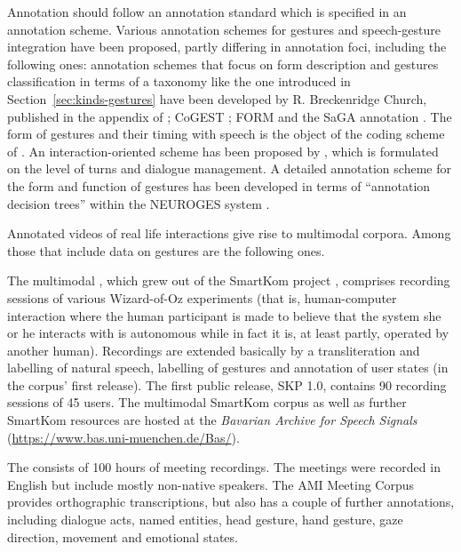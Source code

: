 \documentclass[output=paper
                ,modfonts
                ,nonflat
	        ,collection
	        ,collectionchapter
	        ,collectiontoclongg
 	        ,biblatex
                ,babelshorthands
                ,newtxmath
                ,draftmode
                ,colorlinks, citecolor=brown
]{./langsci/langscibook}
\begin{document}
Annotation should follow an annotation standard which is specified in an annotation scheme.
%
Various annotation schemes for gestures and speech-gesture integration have been proposed, partly differing in annotation foci, including the following ones:
%
annotation schemes that focus on form description and gestures classification in terms of a taxonomy like the one introduced in Section~\ref{sec:kinds-gestures} have been developed by R. Breckenridge Church, published in the appendix of \citet{McNeill:1992}; CoGEST \citep{Gibbon:et:al:2003}; FORM \citep{Martell:Osborn:Friedman:Howard:2002} and the SaGA annotation \citep{Luecking:Bergmann:Hahn:Kopp:Rieser:2013}.
%
The form of gestures and their timing with speech is the object of the coding scheme of \citet{Kipp:Neff:Albrecht:2007}.
%
An interaction-oriented scheme has been proposed by \citet{Allwood:et:al:2007}, which is formulated on the level of turns and dialogue management.
%
A detailed annotation scheme for the form and function of gestures has been developed in terms of \enquote{annotation decision trees} within the NEUROGES system \citep{Lausberg:Sloetjes:2009}.


Annotated videos of real life interactions give rise to multimodal corpora. 
%
Among those that include data on gestures are the following ones.

The multimodal  \citep{Schiel:Steininger:Tuerk:2003}, which grew out of the SmartKom project \citep{Wahlster:2006}, comprises recording sessions of various Wizard-of-Oz experiments (that is, human-computer interaction where the human participant is made to believe that the system she or he interacts with is autonomous while in fact it is, at least partly, operated by another human).
%
Recordings are extended basically by a transliteration and labelling of natural speech, labelling of gestures and annotation of user states (in the corpus' first release). 
%
The first public release, SKP 1.0, contains 90 recording sessions of 45 users. 
%
The multimodal SmartKom corpus as well as further SmartKom resources are hosted at the \textit{Bavarian Archive for Speech Signals} (\url{https://www.bas.uni-muenchen.de/Bas/}).


The  \citep{Carletta:et:al:2006} consists of 100 hours of meeting recordings.
%
The meetings were recorded in English but include mostly non-native speakers. 
%
The AMI Meeting Corpus provides orthographic transcriptions, but also has a couple of further annotations, including dialogue acts, named entities, head gesture, hand gesture, gaze direction, movement and emotional states.
\end{document}
